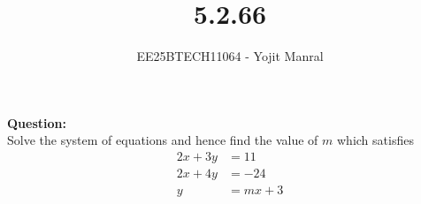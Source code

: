\documentclass[journal]{IEEEtran}
\begin{document}

\vspace{3cm}

\title{5.2.66}
\author{EE25BTECH11064 - Yojit Manral}

\maketitle
{\let\newpage\relax\maketitle}
\renewcommand{\thefigure}{\theenumi}
\renewcommand{\thetable}{\theenumi}
\setlength{\intextsep}{10pt} %

\textbf{Question:}\\
Solve the system of equations and hence find the value of $m$ which satisfies
\begin{align}
    2x + 3y &= 11 \\
    2x + 4y &= -24 \\
    y &= mx + 3
\end{align}
\end{document}
